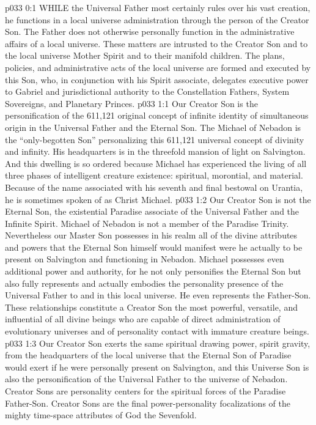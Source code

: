 \vs p033 0:1 WHILE the Universal Father most certainly rules over his vast creation, he functions in a local universe administration through the person of the Creator Son. The Father does not otherwise personally function in the administrative affairs of a local universe. These matters are intrusted to the Creator Son and to the local universe Mother Spirit and to their manifold children. The plans, policies, and administrative acts of the local universe are formed and executed by this Son, who, in conjunction with his Spirit associate, delegates executive power to Gabriel and jurisdictional authority to the Constellation Fathers, System Sovereigns, and Planetary Princes.
\vs p033 1:1 Our Creator Son is the personification of the 611,121 original concept of infinite identity of simultaneous origin in the Universal Father and the Eternal Son. The Michael of Nebadon is the “only\hyp{}begotten Son” personalizing this 611,121 universal concept of divinity and infinity. His headquarters is in the threefold mansion of light on Salvington. And this dwelling is so ordered because Michael has experienced the living of all three phases of intelligent creature existence: spiritual, morontial, and material. Because of the name associated with his seventh and final bestowal on Urantia, he is sometimes spoken of as Christ Michael.
\vs p033 1:2 Our Creator Son is not the Eternal Son, the existential Paradise associate of the Universal Father and the Infinite Spirit. Michael of Nebadon is not a member of the Paradise Trinity. Nevertheless our Master Son possesses in his realm all of the divine attributes and powers that the Eternal Son himself would manifest were he actually to be present on Salvington and functioning in Nebadon. Michael possesses even additional power and authority, for he not only personifies the Eternal Son but also fully represents and actually embodies the personality presence of the Universal Father to and in this local universe. He even represents the Father\hyp{}Son. These relationships constitute a Creator Son the most powerful, versatile, and influential of all divine beings who are capable of direct administration of evolutionary universes and of personality contact with immature creature beings.
\vs p033 1:3 Our Creator Son exerts the same spiritual drawing power, spirit gravity, from the headquarters of the local universe that the Eternal Son of Paradise would exert if he were personally present on Salvington, and  this Universe Son is also the personification of the Universal Father to the universe of Nebadon. Creator Sons are personality centers for the spiritual forces of the Paradise Father\hyp{}Son. Creator Sons are the final power\hyp{}personality focalizations of the mighty time\hyp{}space attributes of God the Sevenfold.
